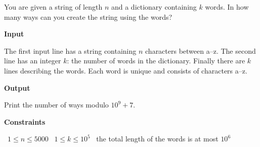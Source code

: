 You are given a string of length $n$ and a dictionary containing $k$ words. In how many ways can you create the string using the words?

\vspace{0.3cm}\noindent\textbf{Input}

The first input line has a string containing $n$ characters between a–z.
The second line has an integer $k$: the number of words in the dictionary.
Finally there are $k$ lines describing the words. Each word is unique and consists of characters a–z.

\vspace{0.3cm}\noindent\textbf{Output}

Print the number of ways modulo $10^9+7$.

\vspace{0.3cm}\noindent\textbf{Constraints}

\textbullet\ $1 \le n \le 5000$
\textbullet\ $1 \le k \le 10^5$
\textbullet\ the total length of the words is at most $10^6$